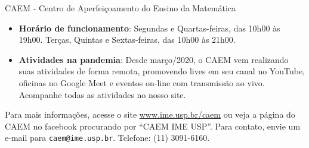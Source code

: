 \begin{secao}{CAEM - Centro de Aperfeiçoamento do Ensino da Matemática}
\begin{itemize}
\item \textbf{Horário de funcionamento}: Segundas e Quartas-feiras,
  das 10h00 às 19h00. Terças, Quintas e Sextas-feiras, das 10h00 às
  21h00.
  
\item \textbf{Atividades na pandemia}: Desde março/2020, o CAEM vem realizando
suas atividades de forma remota, promovendo lives em seu canal no YouTube,
oficinas no Google Meet e eventos on-line com transmissão ao vivo. Acompanhe
todas as atividades no nosso site. %
  
\end{itemize}

Para mais informações, acesse o site \url{www.ime.usp.br/caem} ou veja
a página do CAEM no facebook procurando por ``CAEM IME USP''. Para
contato, envie um e-mail para {\tt caem@ime.usp.br}. Telefone:
(11) 3091-6160.


\end{secao}
